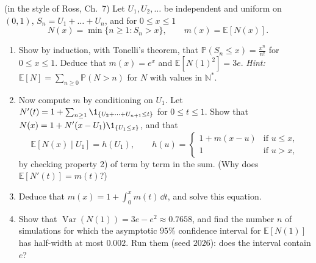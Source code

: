 \begin{exercise}\label{ex:ce-renewal}
\hard (in the style of Ross, Ch.~7) Let $U_1,U_2,\dots$ be independent and uniform on $(0,1)$,
$S_n=U_1+\dots+U_n$, and for $0\le x\le1$
\[
  N(x)=\min\{n\ge1:S_n>x\},\qquad m(x)=\mathbb E[N(x)] .
\]
\begin{enumerate}[label=(\alph*)]
  \item Show by induction, with Tonelli's theorem, that $\mathbb P(S_n\le x)=\frac{x^n}{n!}$ for
    $0\le x\le1$. Deduce that $m(x)=e^x$ and $\mathbb E[N(1)^2]=3e$. \emph{Hint:}
    $\mathbb E[N]=\sum_{n\ge0}\mathbb P(N>n)$ for $N$ with values in $\mathbb N^*$.
  \item Now compute $m$ by conditioning on $U_1$. Let
    $N'(t)=1+\sum_{n\ge1}\1_{\{U_2+\dots+U_{n+1}\le t\}}$ for $0\le t\le1$. Show that
    $N(x)=1+N'(x-U_1)\1_{\{U_1\le x\}}$, and that
    \[
      \mathbb E[N(x)\mid U_1]=h(U_1),\qquad h(u)=\begin{cases}1+m(x-u)&\text{if }u\le x,\\1&\text{if }u>x,\end{cases}
    \]
    by checking property 2) of  term by term in the sum.
    (Why does $\mathbb E[N'(t)]=m(t)$?)
  \item Deduce that $m(x)=1+\int_0^xm(t)\,\dd t$, and solve this equation.
  \item Show that $\operatorname{Var}(N(1))=3e-e^2\approx0.7658$, and find the number $n$ of
    simulations for which the asymptotic $95\%$ confidence interval for $\mathbb E[N(1)]$ has
    half-width at most $0.002$. Run them (seed $2026$): does the interval contain $e$?
\end{enumerate}
\end{exercise}

